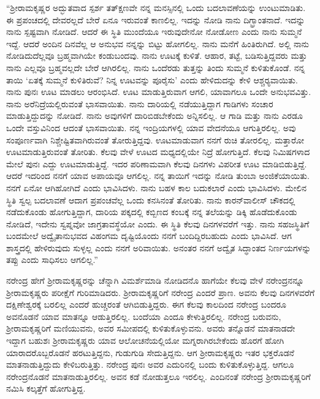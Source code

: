 “ಶ‍್ರೀರಾಮಕೃಷ್ಣರ ಅದ್ಭುತವಾದ ಸ್ಪರ್ಶ ‍ತತ್‍ಕ್ಷಣವೇ ನನ್ನ ಮನಸ್ಸಿನಲ್ಲಿ ಒಂದು ಬದಲಾವಣೆಯನ್ನು ಉಂಟುಮಾಡಿತು. ಈ ಪ್ರಪಂಚದಲ್ಲಿ ದೇವರಲ್ಲದೆ ಬೇರೆ ಏನೂ ಇರುವಂತೆ ಕಾಣಲಿಲ್ಲ. ಇದನ್ನು ನೋಡಿ ನಾನು ದಿಗ್ಭ್ರಾಂತನಾದೆ. ಇದನ್ನು ನಾನು ಸ್ಪಷ್ಟವಾಗಿ ನೋಡಿದೆ. ಆದರೆ ಈ ಸ್ಥಿತಿ ಮುಂದೆಯೂ ಇರುವುದೇನೋ ನೋಡೋಣ ಎಂದು ನಾನು ಸುಮ್ಮನೆ ಇದ್ದೆ. ಆದರೆ ಅಂದಿನ ದಿನವೆಲ್ಲ ಆ ಅನುಭವ ನನ್ನನ್ನು ಬಿಟ್ಟು ಹೋಗಲಿಲ್ಲ. ನಾನು ಮನೆಗೆ ಹಿಂತಿರುಗಿದೆ. ಅಲ್ಲಿ ನಾನು ನೋಡಿದುದೆಲ್ಲವೂ ಬ್ರಹ್ಮವಾಗಿಯೇ ಕಂಡುಬಂದವು. ನಾನು ಊಟಕ್ಕೆ ಕುಳಿತೆ. ಆಹಾರ, ತಟ್ಟೆ, ಬಡಿಸುತ್ತಿದ್ದವರು ಮತ್ತು ನಾನು ಎಲ್ಲವೂ ಬ್ರಹ್ಮವಲ್ಲದೇ ಬೇರೆ ಆಗಿರಲಿಲ್ಲ. ನಾನು ಒಂದೆರಡು ತುತ್ತನ್ನು ತಿಂದು ಸುಮ್ಮನೆ ಕುಳಿತುಕೊಂಡೆ. ನನ್ನ ತಾಯಿ ‘ಏತಕ್ಕೆ ಸುಮ್ಮನೆ ಕುಳಿತಿರುವೆ? ನಿನ್ನ ಊಟವನ್ನು ಪೂರೈಸು’ ಎಂದು ಹೇಳಿದುದನ್ನು ಕೇಳಿ ಆಶ್ಚರ‍್ಯವಾಯಿತು. ನಾನು ಪುನಃ ಊಟ ಮಾಡಲು ಆರಂಭಿಸಿದೆ. ಊಟ ಮಾಡುತ್ತಿರುವಾಗ ಆಗಲಿ, ಯಾವಾಗಲೂ ಒಂದೇ ಅನುಭವವಿತ್ತು. ನಾನು ಅರೆನಿದ್ರೆಯಲ್ಲಿರುವಂತೆ ಭಾಸವಾಯಿತು. ನಾನು ದಾರಿಯಲ್ಲಿ ನಡೆಯುತ್ತಿದ್ದಾಗ ಗಾಡಿಗಳು ಸಂಚಾರ ಮಾಡುತ್ತಿದ್ದುದನ್ನು ನೋಡಿದೆ. ನಾನು ಅವುಗಳಿಗೆ ದಾರಿಬಿಡಬೇಕೆಂದು ಅನ್ನಿಸಲಿಲ್ಲ. ಆ ಗಾಡಿ ಮತ್ತು ನಾನು ಎರಡೂ ಒಂದೇ ವಸ್ತುವಿನಿಂದ ಆದಂತೆ ಭಾಸವಾಯಿತು. ನನ್ನ ಇಂದ್ರಿಯಗಳಲ್ಲಿ ಯಾವ ವೇದನೆಯೂ ಆಗುತ್ತಿರಲಿಲ್ಲ. ಅವು ಸಂಪೂರ್ಣವಾಗಿ ನಿಶ್ಚೇಷ್ಟಿತವಾಗಿರುವಂತೆ ತೋರುತ್ತಿದ್ದವು. ಊಟಮಾಡುವಾಗ ನನಗೆ ರುಚಿ ತೋರಲಿಲ್ಲ. ಮತ್ತಾರೋ ಊಟಮಾಡುತ್ತಿರುವಂತೆ ತೋರಿತು. ಕೆಲವು ವೇಳೆ ಊಟದ ಮಧ್ಯದಲ್ಲಿಯೇ ನಿದ್ರೆ ಹೋಗುತ್ತಿದೆ. ಕೆಲವು ನಿಮಿಷಗಳಾದ ಮೇಲೆ ಪುನಃ ಎದ್ದು ಊಟಮಾಡುತ್ತಿದ್ದೆ. ಇದರ ಪರಿಣಾಮವಾಗಿ ಕೆಲವು ದಿನಗಳು ವಿಪರೀತ ಊಟ ಮಾಡಿಬಿಡುತ್ತಿದ್ದೆ. ಆದರೆ ಇದರಿಂದ ನನಗೆ ಯಾವ ಅಪಾಯವೂ ಆಗಲಿಲ್ಲ. ನನ್ನ ತಾಯಿಗೆ ಇದನ್ನು ನೋಡಿ ತುಂಬಾ ಅಂಜಿಕೆಯಾಯಿತು. ನನಗೆ ಏನೋ ಆಗಿಹೋಗಿದೆ ಎಂದು ಭಾವಿಸಿದಳು. ನಾನು ಬಹಳ ಕಾಲ ಬದುಕಲಾರೆ ಎಂದು ಭಾವಿಸಿದಳು. ಮೇಲಿನ ಸ್ಥಿತಿ ಸ್ವಲ್ಪ ಬದಲಾವಣೆ ಆದಾಗ ಪ್ರಪಂಚವೆಲ್ಲ ಒಂದು ಕನಸಿನಂತೆ ತೋರಿತು. ನಾನು ಕಾರನ್‍ವಾಲೀಸ್ ಚೌಕದಲ್ಲಿ ನಡೆದುಕೊಂಡು ಹೋಗುತ್ತಿದ್ದಾಗ, ದಾರಿಯ ಪಕ್ಕದಲ್ಲಿ ಕಬ್ಬಿಣದ ಕಂಬಕ್ಕೆ ನನ್ನ ತಲೆಯನ್ನು ಡಿಕ್ಕಿ ಹೊಡೆದುಕೊಂಡು ನೋಡಿದೆ, ಇದೇನು ಸ್ವಪ್ನವೋ ಜಾಗ್ರತಾವಸ್ಥೆಯೋ ಎಂದು. ಈ ಸ್ಥಿತಿ ಕೆಲವು ದಿನಗಳವರೆಗೆ ಇತ್ತು. ನಾನು ಸಹಜಸ್ಥಿತಿಗೆ ಬಂದಮೇಲೆ ಅದ್ವೈತಾನುಭವದ ವಿಹಂಗಮ ದೃಷ್ಟಿಯೊಂದು ನನಗೆ ಬಂದಿದ್ದಿರಬಹುದು ಎಂದು ಭಾವಿಸಿದೆ. ಆಗ ಶಾಸ್ತ್ರದಲ್ಲಿ ಹೇಳಿರುವುದು ಸುಳ್ಳಲ್ಲ ಎಂದು ನನಗೆ ಅರಿವಾಯಿತು. ಅನಂತರ ನನಗೆ ಅದ್ವೈತ ಸಿದ್ಧಾಂತದ ನಿರ್ಣಯಗಳನ್ನು ತಪ್ಪು ಎಂದು ಸಾಧಿಸಲು ಆಗಲಿಲ್ಲ.”

ನರೇಂದ್ರ ಹೇಗೆ ಶ‍್ರೀರಾಮಕೃಷ್ಣರನ್ನು ಚೆನ್ನಾಗಿ ವಿಮರ್ಶೆಮಾಡಿ ನೋಡಿದನೊ ಹಾಗೆಯೇ ಕೆಲವು ವೇಳೆ ನರೇಂದ್ರನನ್ನೂ ಶ‍್ರೀರಾಮಕೃಷ್ಣರು ಪರೀಕ್ಷೆಗೆ ಗುರಿಮಾಡಿದರು. ಶ‍್ರೀರಾಮಕೃಷ್ಣರಿಗೆ ನರೇಂದ್ರ ಎಂದರೆ ಪ್ರಾಣ. ಅವನು ಕೆಲವು ದಿನಗಳವರೆಗೆ ದಕ್ಷಿಣೇಶ್ವರಕ್ಕೆ ಬರಲಿಲ್ಲ ಎಂದರೆ ಹುಚ್ಚರಂತೆ ಆಗಿಬಿಡುತ್ತಿದ್ದರು. ಈಗ ಕೆಲವು ಕಾಲದಿಂದ ನರೇಂದ್ರ ಬಂದರೂ ಅವನೊಡನೆ ಯಾವ ಮಾತನ್ನೂ ಆಡುತ್ತಿರಲಿಲ್ಲ. ಬಂದೆಯಾ ಎಂದೂ ಕೇಳುತ್ತಿರಲಿಲ್ಲ. ನರೇಂದ್ರ ಬರುವನು, ಶ‍್ರೀರಾಮಕೃಷ್ಣರಿಗೆ ಮಣಿಯುವನು, ಅವರ ಸಮೀಪದಲ್ಲಿ ಕುಳಿತುಕೊಳ್ಳುವನು. ಅವರು ತನ್ನೊಡನೆ ಮಾತನಾಡದೇ ಇದ್ದಾಗ ಬಹುಶಃ ಶ‍್ರೀರಾಮಕೃಷ್ಣರು ಯಾವ ಆಲೋಚನೆಯಲ್ಲಿಯೋ ಮಗ್ನರಾಗಿರಬೇಕೆಂದು ಹೊರಗೆ ಹೋಗಿ ಯಾರಾದರೊಬ್ಬರೊಡನೆ ಹರಟುತ್ತಿದ್ದನು, ಗುಡುಗುಡಿ ಸೇದುತ್ತಿದ್ದನು. ಆಗ ಶ‍್ರೀರಾಮಕೃಷ್ಣರು ಇತರ ಭಕ್ತರೊಡನೆ ಮಾತನಾಡುತ್ತಿದ್ದುದು ಕೇಳಿಬರುತ್ತಿತ್ತು. ನರೇಂದ್ರ ಪುನಃ ಅವರ ಎದುರಿನಲ್ಲಿ ಬಂದು ಕುಳಿತುಕೊಳ್ಳುತ್ತಿದ್ದ. ಆಗಲೂ ನರೇಂದ್ರನೊಡನೆ ಮಾತನಾಡುತ್ತಿರಲಿಲ್ಲ. ಅವನ ಕಡೆ ನೋಡುತ್ತಲೂ ಇರಲಿಲ್ಲ. ಎಂದಿನಂತೆ ನರೇಂದ್ರ ಶ‍್ರೀರಾಮಕೃಷ್ಣರಿಗೆ ನಮಿಸಿ ಕಲ್ಕತ್ತೆಗೆ ಹೋಗುತ್ತಿದ್ದ.

